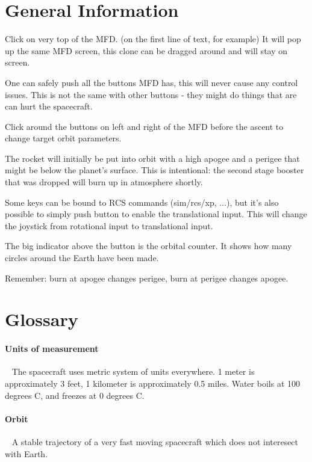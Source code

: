 \onehalfspacing


\onecolumn
\section{General Information}
Click on very top of the MFD. (on the first line of text, for example) It will pop up the same MFD screen, this clone can be dragged around and will stay on screen.

One can safely push all the buttons MFD has, this will never cause any control issues. This is not the same with other buttons - they might do things that are can hurt the spacecraft.

Click around the buttons on left and right of the MFD before the ascent to change target orbit parameters.

The rocket will initially be put into orbit with a high apogee and a perigee that might be below the planet's surface. This is intentional: the second stage booster that was dropped will burn up in atmosphere shortly.

Some keys can be bound to RCS commands (sim/rcs/xp, ...), but it's also possible to simply push  button to enable the translational input. This will change the joystick from rotational input to translational input.

The big indicator above the  button is the orbital counter. It shows how many circles around the Earth have been made.

Remember: burn at apogee changes perigee, burn at perigee changes apogee.


\section{Glossary}

\paragraph{Units of measurement}~
The spacecraft uses metric system of units everywhere. 1 meter is approximately 3 feet, 1 kilometer is approximately 0.5 miles. Water boils at 100 degrees C, and freezes at 0 degrees C.

\paragraph{Orbit}~
A stable trajectory of a very fast moving spacecraft which does not interesect with Earth.

